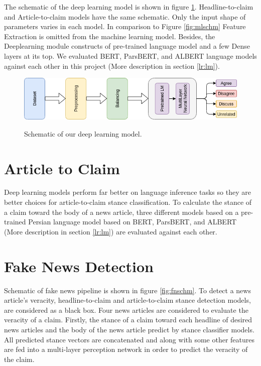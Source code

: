 The schematic of the deep learning model is shown in figure \ref{fig:dlschm}. Headline-to-claim and Article-to-claim models have the same schematic. Only the input shape of parameters varies in each model. In comparison to Figure \ref{fig:mlschm} Feature Extraction is omitted from the machine learning model. Besides, the Deeplearning module constructs of pre-trained language model and a few Dense layers at its top. We evaluated BERT, ParsBERT, and ALBERT language models against each other in this project (More description in section \ref{lr:lm}).
\begin{figure}%
	\centering
	{\includegraphics[width=14.5cm]{statistics/schema/dl.png} }
	\caption{Schematic of our deep learning model.}%
	\label{fig:dlschm}%
\end{figure}


\section{Article to Claim}
\label{mth:a2c}
Deep learning models perform far better on language inference tasks so they are better choices for article-to-claim stance classification. To calculate the stance of a claim toward the body of a news article, three different models based on a pre-trained Persian language model based on BERT, ParsBERT, and  ALBERT (More description in section \ref{lr:lm}) are evaluated against each other. 

\section{Fake News Detection}
\label{mth:fn}
	\label{sec:fakenews}
Schematic of fake news pipeline is shown in figure \ref{fig:fnschm}. To detect a news article's veracity, headline-to-claim and article-to-claim stance detection models, are considered as a black box. Four news articles are considered to evaluate the veracity of a claim. Firstly, the stance of a claim toward each headline of desired news articles and the body of the news article predict by stance classifier models. All predicted stance vectors are concatenated and along with some other features are fed into a multi-layer perception network in order to predict the veracity of the claim.

